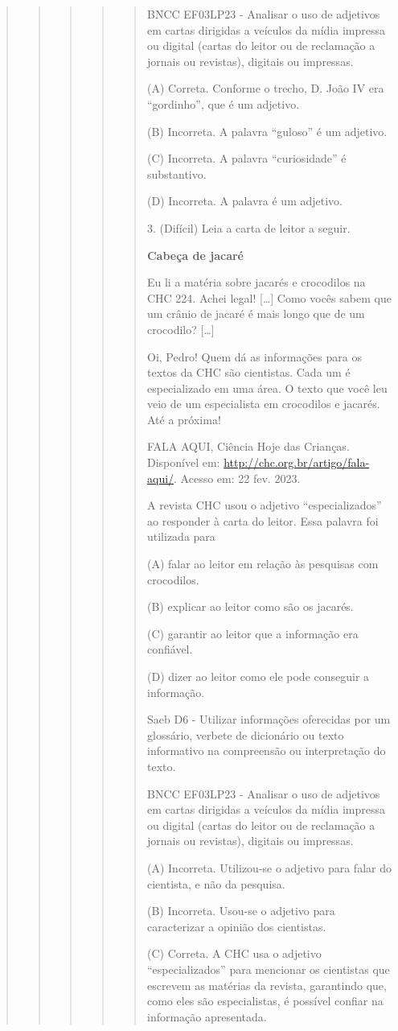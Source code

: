 \begin{quote}
\begin{quote}
\begin{quote}
\begin{quote}
\begin{quote}
BNCC EF03LP23 - Analisar o uso de adjetivos em cartas dirigidas a
veículos da mídia impressa ou digital (cartas do leitor ou de reclamação
a jornais ou revistas), digitais ou impressas.

(A) Correta. Conforme o trecho, D. João IV era ``gordinho'', que é um
adjetivo.

(B) Incorreta. A palavra ``guloso'' é um adjetivo.

(C) Incorreta. A palavra ``curiosidade'' é substantivo.

(D) Incorreta. A palavra é um adjetivo.

3. (Difícil) Leia a carta de leitor a seguir.

\textbf{Cabeça de jacaré}

Eu li a matéria sobre jacarés e crocodilos na CHC 224. Achei legal!
{[}\ldots{}{]} Como vocês sabem que um crânio de jacaré é mais longo que
de um crocodilo? {[}\ldots{}{]}

Oi, Pedro! Quem dá as informações para os textos da CHC são cientistas.
Cada um é especializado em uma área. O texto que você leu veio de um
especialista em crocodilos e jacarés. Até a próxima!

FALA AQUI, Ciência Hoje das Crianças. Disponível em:
\url{http://chc.org.br/artigo/fala-aqui/}. Acesso em: 22 fev. 2023.

A revista CHC usou o adjetivo ``especializados'' ao responder à carta do
leitor. Essa palavra foi utilizada para

(A) falar ao leitor em relação às pesquisas com crocodilos.

(B) explicar ao leitor como são os jacarés.

(C) garantir ao leitor que a informação era confiável.

(D) dizer ao leitor como ele pode conseguir a informação.

Saeb D6 - Utilizar informações oferecidas por um glossário, verbete de
dicionário ou texto informativo na compreensão ou interpretação do
texto.

BNCC EF03LP23 - Analisar o uso de adjetivos em cartas dirigidas a
veículos da mídia impressa ou digital (cartas do leitor ou de reclamação
a jornais ou revistas), digitais ou impressas.

(A) Incorreta. Utilizou-se o adjetivo para falar do cientista, e não da
pesquisa.

(B) Incorreta. Usou-se o adjetivo para caracterizar a opinião dos
cientistas.

(C) Correta. A CHC usa o adjetivo ``especializados'' para mencionar os
cientistas que escrevem as matérias da revista, garantindo que, como
eles são especialistas, é possível confiar na informação apresentada.


\end{quote}
\end{quote}
\end{quote}
\end{quote}
\end{quote}
